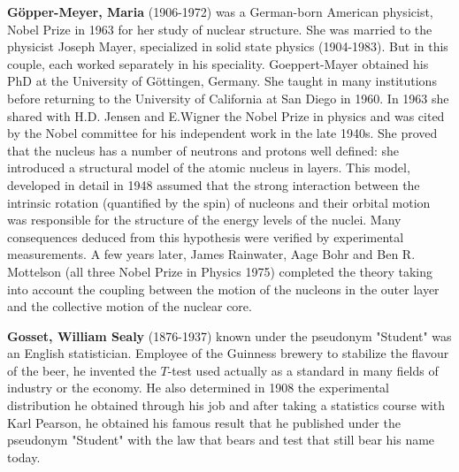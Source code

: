 \textbf{Göpper-Meyer, Maria} (1906-1972) was a German-born American physicist, Nobel Prize in 1963 for her study of nuclear structure. She was married to the physicist Joseph Mayer, specialized in solid state physics (1904-1983). But in this couple, each worked separately in his speciality. Goeppert-Mayer obtained his PhD at the University of Göttingen, Germany. She taught in many institutions before returning to the University of California at San Diego in 1960. In 1963 she shared with H.D. Jensen and  E.Wigner the Nobel Prize in physics and was cited by the Nobel committee for his independent work in the late 1940s. She proved that the nucleus has a number of neutrons and protons well defined: she introduced a structural model of the atomic nucleus in layers. This model, developed in detail in 1948 assumed that the strong interaction between the intrinsic rotation (quantified by the spin) of nucleons and their orbital motion was responsible for the structure of the energy levels of the nuclei. Many consequences deduced from this hypothesis were verified by experimental measurements. A few years later, James Rainwater, Aage Bohr and Ben R. Mottelson (all three Nobel Prize in Physics 1975) completed the theory taking into account the coupling between the motion of the nucleons in the outer layer and the collective motion of the nuclear core.

\textbf{Gosset, William Sealy} (1876-1937) known under the pseudonym "Student" was an English statistician. Employee of the Guinness brewery to stabilize the flavour of the beer, he invented the $T$-test used actually as a standard in many fields of industry or the economy. He also determined in 1908 the experimental distribution he obtained through his job and after taking a statistics course with Karl Pearson, he obtained his famous result that he published under the pseudonym "Student" with the law that bears and test that still bear his name today.\\

